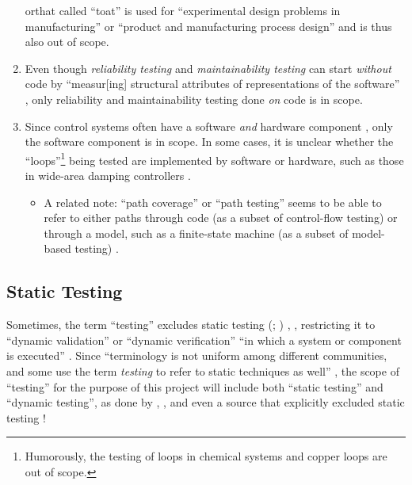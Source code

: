 \begin{enumerate}
          \acs{orthat} called ``\acf{toat}'' is used for ``experimental design
          problems in manufacturing'' \citep[p.~1573]{YuEtAl2011} or ``product
          and manufacturing process design'' \cite[p.~44]{Tsui2007} and is thus
          also out of scope.
    \item Even though \emph{reliability testing} and \emph{maintainability
              testing} can start \emph{without} code by ``measur[ing]
          structural attributes of representations of the software''
          \citep[p.~18]{FentonAndPfleeger1997}, only reliability and
          maintainability testing done \emph{on} code is in scope.
    \item Since control systems often have a software \emph{and} hardware
          component \citep{ISO2015, PreußeEtAl2012,ForsythEtAl2004},
          only the software component is in scope. In some cases, it is
          unclear whether the ``loops''\footnote{Humorously, the testing of
              loops in chemical systems \citep{Dominguez-PumarEtAl2020} and
              copper loops \citep{Goralski1999} are out of scope.} being
          tested are implemented by software or hardware, such as those in
          wide-area damping controllers \citep{PierreEtAl2017, TrudnowskiEtAl2017}.
          \begin{itemize}
              \item A related note: ``path coverage'' or ``path testing''
                    seems to be able to refer to either paths through code
                    (as a subset of control-flow testing)
                    \citep[p.~5-13]{SWEBOK2024} or through a model, such as
                    a finite-state machine (as a subset of model-based
                    testing) \citep[p.~184]{DoğanEtAl2014}.
          \end{itemize}
          \fi
\end{enumerate}

\ifnotpaper
    \subsection{Static Testing}
    \label{static-test}
    Sometimes, the term ``testing'' excludes static testing
    \ifnotpaper
        (\citealp[p.~222]{AmmannAndOffutt2017}; \citealp[p.~13]{Firesmith2015})%
    \else
        \cite[p.~222]{AmmannAndOffutt2017}, \cite[p.~13]{Firesmith2015}%
    \fi, restricting it to ``dynamic validation'' \citep[p.~5-1]{SWEBOK2024} or
    ``dynamic verification'' ``in which a system or component is
    executed'' \citep[p.~427]{IEEE2017}. Since ``terminology is not uniform
    among different communities, and some use the term \emph{testing} to refer to
    static techniques as well''
    \citep[p.~5-2]{SWEBOK2024}, the scope of ``testing'' for the purpose of this
    project will include both ``static testing'' and ``dynamic testing'', as
    done by \citet[p.~17]{IEEE2022}, \citet[pp.~8-9]{Gerrard2000a}, and even a
    source that explicitly excluded static testing \citep[p.~440]{IEEE2017}!

